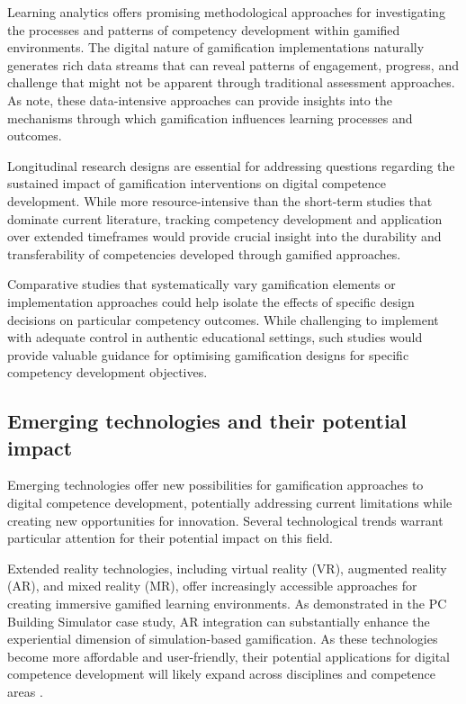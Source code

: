 \documentclass[cte]{acnsart}
\begin{document}
Learning analytics offers promising methodological approaches for investigating the processes and patterns of competency development within gamified environments. The digital nature of gamification implementations naturally generates rich data streams that can reveal patterns of engagement, progress, and challenge that might not be apparent through traditional assessment approaches. As \citet{Nunez202329} note, these data-intensive approaches can provide insights into the mechanisms through which gamification influences learning processes and outcomes.

Longitudinal research designs are essential for addressing questions regarding the sustained impact of gamification interventions on digital competence development. While more resource-intensive than the short-term studies that dominate current literature, tracking competency development and application over extended timeframes would provide crucial insight into the durability and transferability of competencies developed through gamified approaches.

Comparative studies that systematically vary gamification elements or implementation approaches could help isolate the effects of specific design decisions on particular competency outcomes. While challenging to implement with adequate control in authentic educational settings, such studies would provide valuable guidance for optimising gamification designs for specific competency development objectives.

\subsection{Emerging technologies and their potential impact}

Emerging technologies offer new possibilities for gamification approaches to digital competence development, potentially addressing current limitations while creating new opportunities for innovation. Several technological trends warrant particular attention for their potential impact on this field.

Extended reality technologies, including virtual reality (VR), augmented reality (AR), and mixed reality (MR), offer increasingly accessible approaches for creating immersive gamified learning environments. As demonstrated in the PC Building Simulator case study, AR integration can substantially enhance the experiential dimension of simulation-based gamification. As these technologies become more affordable and user-friendly, their potential applications for digital competence development will likely expand across disciplines and competence areas \cite{Li2024}.
\end{document}
